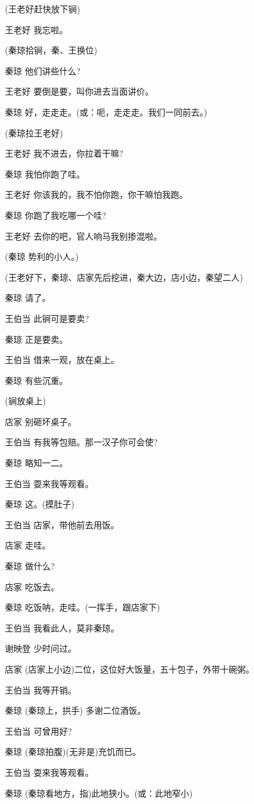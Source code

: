 (王老好赶快放下锏)

王老好 我忘啦。

(秦琼拾锏，秦、王换位)

秦琼 他们讲些什么?

王老好 要倒是要，叫你进去当面讲价。

秦琼 好，走走走。(或：呃，走走走。我们一同前去。)

(秦琼拉王老好)

王老好 我不进去，你拉着干嘛?

秦琼 我怕你跑了哇。

王老好 你该我的，我不怕你跑，你干嘛怕我跑。

秦琼 你跑了我吃哪一个哇?

王老好 去你的吧，官人响马我别掺混啦。

(秦琼 势利的小人。)

(王老好下，秦琼、店家先后挖进，秦大边，店小边，秦望二人)

秦琼 请了。

王伯当 此锏可是要卖?

秦琼 正是要卖。

王伯当 借来一观，放在桌上。

秦琼 有些沉重。

(锏放桌上)

店家 别砸坏桌子。

王伯当 有我等包赔。那一汉子你可会使?

秦琼 略知一二。

王伯当 耍来我等观看。

秦琼 这。(摸肚子)

王伯当 店家，带他前去用饭。

店家 走哇。

秦琼 做什么?

店家 吃饭去。

秦琼 吃饭呐，走哇。(一挥手，跟店家下)

王伯当 我看此人，莫非秦琼。

谢映登 少时问过。

店家 (店家上小边)二位，这位好大饭量，五十包子，外带十碗粥。

王伯当 我等开销。

秦琼 (秦琼上，拱手) 多谢二位酒饭。

王伯当 可曾用好?

秦琼 (秦琼拍腹)(无非是)充饥而已。

王伯当 耍来我等观看。

秦琼 (秦琼看地方，指)此地狭小。(或：此地窄小)

